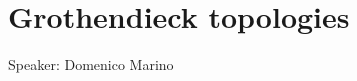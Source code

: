 \chapter{Grothendieck topologies}
\begin{center}
	{\huge Speaker: Domenico Marino}
\end{center}
\bigskip






